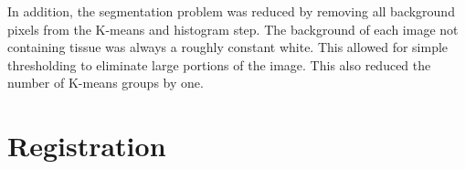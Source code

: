 \documentclass[letterpaper,10pt,oneside]{article}
\begin{document}
In addition, the segmentation problem was reduced by removing all background pixels from the K-means and histogram step. The background of each image not containing tissue was always a roughly constant white. This allowed for simple thresholding to eliminate large portions of the image. This also reduced the number of K-means groups by one.



\section{Registration}
\end{document}
